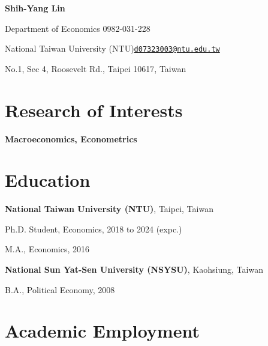 \documentclass{article}
\newcommand{\cvsection}[1]{\section*{\rmfamily#1}}
\begin{document}
\begin{center}
    \Huge{
    \rmfamily
    \textbf{Shih-Yang Lin}}
\end{center}
\vspace{20pt}


\setlength{\parskip}{1pt}
\renewcommand{\arraystretch}{1.25}


\noindent Department of Economics \hfill 0982-031-228

\noindent National Taiwan University (NTU)\hfill \href{mailto:d07323003@ntu.edu.tw}{\texttt{d07323003@ntu.edu.tw}}

\noindent No.1, Sec 4, Roosevelt Rd., Taipei 10617, Taiwan\hfill %


\setlength{\parskip}{3pt}






\cvsection{Research of Interests}
\indent 

\textbf{Macroeconomics, Econometrics}


\cvsection{Education}
\indent 

\textbf{National Taiwan University (NTU)}, Taipei, Taiwan

\hspace{2em}Ph.D. Student, Economics, 2018 to 2024 (expc.)

\hspace{2em}M.A., Economics, 2016

\textbf{National Sun Yat-Sen University (NSYSU)}, Kaohsiung, Taiwan

\hspace{2em}B.A., Political Economy, 2008







\cvsection{Academic Employment}
\indent
\end{document}
